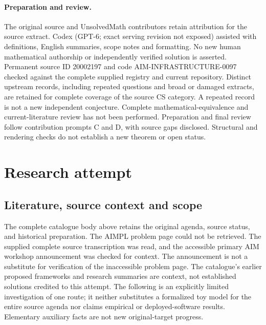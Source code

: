 \documentclass[11pt]{article}
\begin{document}
\paragraph{Preparation and review.}
The original source and UnsolvedMath contributors retain attribution for the source extract. Codex (GPT-6; exact serving revision not exposed) assisted with definitions, English summaries, scope notes and formatting. No new human mathematical authorship or independently verified solution is asserted. Permanent source ID 20002197 and code AIM-INFRASTRUCTURE-0097 checked against the complete supplied registry and current repository. Distinct upstream records, including repeated questions and broad or damaged extracts, are retained for complete coverage of the source CS category. A repeated record is not a new independent conjecture. Complete mathematical-equivalence and current-literature review has not been performed. Preparation and final review follow contribution prompts C and D, with source gaps disclosed. Structural and rendering checks do not establish a new theorem or open status.
\label{end:20002197}

\section{Research attempt}
\subsection{Literature, source context and scope}
The complete catalogue body above retains the original agenda, source status, and historical preparation. The AIMPL problem page could not be retrieved. The supplied complete source transcription was read, and the accessible primary AIM workshop announcement was checked for context. The announcement is not a substitute for verification of the inaccessible problem page. The catalogue's earlier proposed frameworks and research summaries are context, not established solutions credited to this attempt. The following is an explicitly limited investigation of one route; it neither substitutes a formalized toy model for the entire source agenda nor claims empirical or deployed-software results. Elementary auxiliary facts are not new original-target progress.
\end{document}

